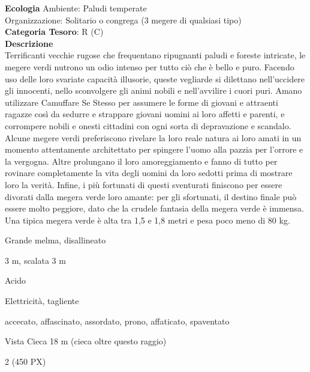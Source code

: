 \begin{multicols}{2}
{\textbf{Ecologia}
Ambiente: Paludi temperate\\
Organizzazione: Solitario o congrega (3 megere di qualsiasi tipo)\\
\textbf{Categoria Tesoro}: R (C)\\
\textbf{Descrizione}\\
Terrificanti vecchie rugose che frequentano ripugnanti paludi e foreste intricate, le megere verdi nutrono un odio intenso per tutto ciò che è bello e puro. Facendo uso delle loro svariate capacità illusorie, queste vegliarde si dilettano nell'uccidere gli innocenti, nello sconvolgere gli animi nobili e nell'avvilire i cuori puri. Amano utilizzare Camuffare Se Stesso per assumere le forme di giovani e attraenti ragazze così da sedurre e strappare giovani uomini ai loro affetti e parenti, e corrompere nobili e onesti cittadini con ogni sorta di depravazione e scandalo. Alcune megere verdi preferiscono rivelare la loro reale natura ai loro amati in un momento attentamente architettato per spingere l'uomo alla pazzia per l'orrore e la vergogna. Altre prolungano il loro amoreggiamento e fanno di tutto per rovinare completamente la vita degli uomini da loro sedotti prima di mostrare loro la verità. Infine, i più fortunati di questi sventurati finiscono per essere divorati dalla megera verde loro amante: per gli sfortunati, il destino finale può essere molto peggiore, dato che la crudele fantasia della megera verde è immensa. Una tipica megera verde è alta tra 1,5 e 1,8 metri e pesa poco meno di 80 kg.

\begin{description}[noitemsep, topsep=0pt, parsep=0pt, partopsep=0pt, itemsep=1pt, leftmargin=2.35cm,  labelwidth=2.2cm, itemindent=0cm, listparindent=0pt] %
\setlength{\baselineskip}{10pt}
\item[\textbf{Taglia/Tipo}] Grande melma, disallineato
\item[\textbf{Caratt.}] 
\item[\textbf{Punti Ferita}] 
\item[\textbf{Movimento}] 3 m, scalata 3 m
\item[\textbf{Tiri Salvez.}] 
\item[\textbf{Res. Danni}] Acido
\item[\textbf{Imm. Danni}] Elettricità, tagliente
\item[\textbf{Immunità}] accecato, affascinato, assordato, prono, affaticato, spaventato
\item[\textbf{Sensi}] Vista Cieca 18 m (cieca oltre questo raggio)
\item[\textbf{Sfida}] 2 (450 PX)
\end{description}
\smallskip

}
\end{multicols}
